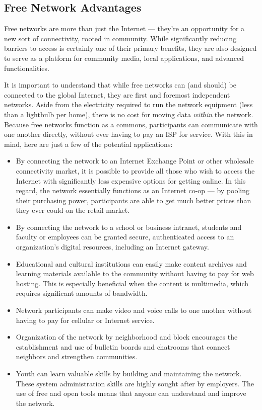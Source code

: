 \subsection{Free Network Advantages}
Free networks are more than just the Internet --- they're an opportunity for a new
sort of connectivity, rooted in community. While significantly reducing barriers
to access is certainly one of their primary benefits, they are also designed to
serve as a platform for community media, local applications, and advanced
functionalities. \par
It is important to understand that while free networks can (and should) be
connected to the global Internet, they are first and foremost independent
networks. Aside from the electricity required to run the network equipment (less
than a lightbulb per home), there is no cost for moving data \emph{within} the network.
Because free networks function as a commons, participants can communicate
with one another directly, without ever having to pay an ISP for service.
With this in mind, here are just a few of the potential applications:
\begin{itemize}
\itemsep0em
\item By connecting the network to an Internet Exchange Point or other wholesale
connectivity market, it is possible to provide all those who wish to access the
Internet with significantly less expensive options for getting online. In this
regard, the network essentially functions as an Internet co-op --- by pooling
their purchasing power, participants are able to get much better prices than
they ever could on the retail market.
\item By connecting the network to a school or business intranet, students and
faculty or employees can be granted secure, authenticated access to an
organization's digital resources, including an Internet gateway. 
\item Educational and cultural institutions can easily make content archives and
learning materials available to the community without having to pay for web
hosting. This is especially beneficial when the content is multimedia, 
which requires significant amounts of bandwidth.
\item Network participants can make video and voice calls to one another without
having to pay for cellular or Internet service.
\item Organization of the network by neighborhood and block encourages the
establishment and use of bulletin boards and chatrooms that connect neighbors
and strengthen communities.
\item Youth can learn valuable skills by building and maintaining the
network. These system administration skills are highly sought after by employers. 
The use of free and open tools means that anyone can understand
and improve the network. 
\end{itemize}


